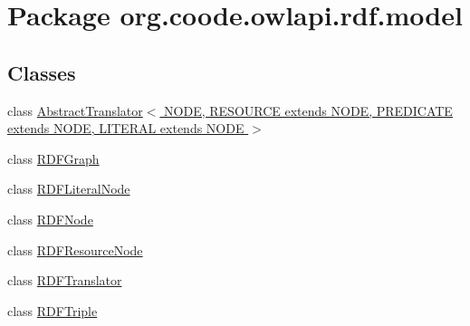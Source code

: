 \hypertarget{namespaceorg_1_1coode_1_1owlapi_1_1rdf_1_1model}{\section{Package org.\-coode.\-owlapi.\-rdf.\-model}
\label{namespaceorg_1_1coode_1_1owlapi_1_1rdf_1_1model}
}
\subsection*{Classes}
\begin{DoxyCompactItemize}
\item 
class \hyperlink{classorg_1_1coode_1_1owlapi_1_1rdf_1_1model_1_1_abstract_translator_3_01_n_o_d_e_00_01_r_e_s_o_ubc597564c2cb8c8d2b0139cb32f3f91c}{Abstract\-Translator$<$ N\-O\-D\-E, R\-E\-S\-O\-U\-R\-C\-E extends N\-O\-D\-E, P\-R\-E\-D\-I\-C\-A\-T\-E extends N\-O\-D\-E, L\-I\-T\-E\-R\-A\-L extends N\-O\-D\-E $>$}
\item 
class \hyperlink{classorg_1_1coode_1_1owlapi_1_1rdf_1_1model_1_1_r_d_f_graph}{R\-D\-F\-Graph}
\item 
class \hyperlink{classorg_1_1coode_1_1owlapi_1_1rdf_1_1model_1_1_r_d_f_literal_node}{R\-D\-F\-Literal\-Node}
\item 
class \hyperlink{classorg_1_1coode_1_1owlapi_1_1rdf_1_1model_1_1_r_d_f_node}{R\-D\-F\-Node}
\item 
class \hyperlink{classorg_1_1coode_1_1owlapi_1_1rdf_1_1model_1_1_r_d_f_resource_node}{R\-D\-F\-Resource\-Node}
\item 
class \hyperlink{classorg_1_1coode_1_1owlapi_1_1rdf_1_1model_1_1_r_d_f_translator}{R\-D\-F\-Translator}
\item 
class \hyperlink{classorg_1_1coode_1_1owlapi_1_1rdf_1_1model_1_1_r_d_f_triple}{R\-D\-F\-Triple}
\end{DoxyCompactItemize}
